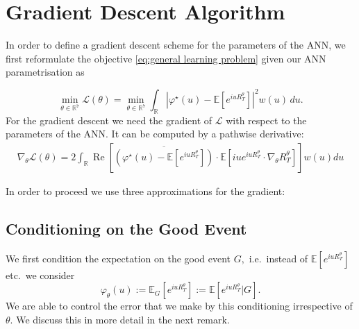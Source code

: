 \documentclass[reqno, 11pt]{amsart}%
\newcommand\cL{\mathcal L}
\newcommand\EE{\mathbb E}
\newcommand\RR{\mathbb R}
\theoremstyle{definition}
\begin{document}
\section{Gradient Descent Algorithm}
In order to define a gradient descent scheme for the parameters of the ANN, we first reformulate the objective \eqref{eq:general learning problem} given our ANN parametrisation as  

\begin{equation}
	\label{eq: parametrised Loss}
	\min_{\theta \in \RR^7} \cL(\theta) = \min_{\theta \in \RR^7} \int_{\mathbb{R}} \left| \varphi^\star(u) - \EE[e^{iu R_T^\theta}]  \right|^2 w(u) \, du.
\end{equation}
For the gradient descent we need the gradient of $\cL$ with respect to the parameters of the ANN. It can be computed by a pathwise derivative:
\begin{align}
\label{eq:def:Gradient_Loss}
   \nabla_\theta \mathcal{L}(\theta) =
   2 \int_{\mathbb{R}} \operatorname{Re} \left[ \overline{\left( \varphi^\star(u)-\EE[e^{iu R_T^\theta}]   \right)}\cdot \mathbb{E}\left[i u e^{i u R_T^\theta} \cdot \nabla_\theta R_T^\theta \right] \right] w(u) du
\end{align}

In order to proceed we use three approximations for the gradient: 
\subsection{Conditioning on the Good Event}
We first condition the expectation on the good event $G,$ i.e.\ instead of $\EE[e^{iu R_T^\theta}]$ etc.\ we consider
$$ \varphi_\theta(u):=\EE_G[e^{iu R_T^\theta}]:= \EE[e^{iu R_T^\theta}|G].$$
We are able to control the error that we make by this conditioning irrespective of $\theta.$ We discuss this in more detail in the next remark.
\end{document}
